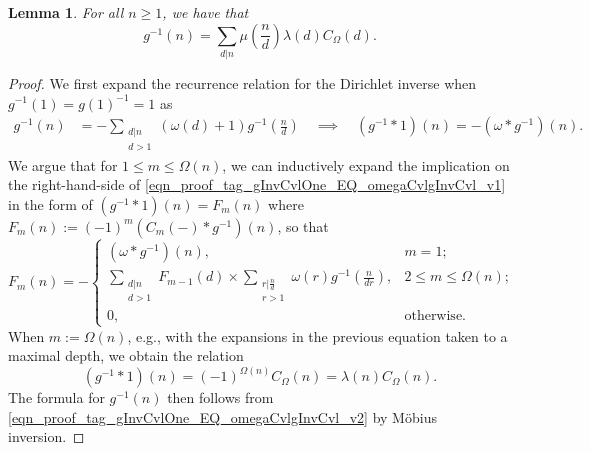 \documentclass[11pt,reqno,a4letter]{article}
\numberwithin{figure}{section}
\numberwithin{table}{section}
\theoremstyle{plain}
\newtheorem{lemma}[theorem]{Lemma}
\numberwithin{theorem}{section}
\theoremstyle{definition}
\begin{document}
\begin{lemma} 
\label{lemma_AnExactFormulaFor_gInvByMobiusInv_v1} 
For all $n \geq 1$, we have that 
\[
g^{-1}(n) = \sum_{d|n} \mu\left(\frac{n}{d}\right) \lambda(d) C_{\Omega}(d). 
\]
\end{lemma}
\begin{proof} 
We first expand the recurrence relation for the Dirichlet inverse 
when $g^{-1}(1) = g(1)^{-1} = 1$ as 
\begin{align} 
\label{eqn_proof_tag_gInvCvlOne_EQ_omegaCvlgInvCvl_v1} 
g^{-1}(n) & = - \sum_{\substack{d|n \\ d>1}} (\omega(d) + 1) g^{-1}\left(\frac{n}{d}\right) 
     \quad\implies\quad 
     (g^{-1} \ast 1)(n) = -(\omega \ast g^{-1})(n). 
\end{align} 
We argue that for $1 \leq m \leq \Omega(n)$, we can inductively expand the 
implication on the right-hand-side of \eqref{eqn_proof_tag_gInvCvlOne_EQ_omegaCvlgInvCvl_v1} 
in the form of $(g^{-1} \ast 1)(n) = F_m(n)$ where 
$F_m(n) := (-1)^{m} (C_m(-) \ast g^{-1})(n)$, so that 
\[
F_m(n) = - 
     \begin{cases} 
     (\omega \ast g^{-1})(n), & m = 1; \\ 
     \sum\limits_{\substack{d|n \\ d > 1}} F_{m-1}(d) \times \sum\limits_{\substack{r|\frac{n}{d} \\ r > 1}} 
     \omega(r) g^{-1}\left(\frac{n}{dr}\right), & 2 \leq m \leq \Omega(n); \\ 
     0, & \text{otherwise.} 
     \end{cases} 
\]
When $m := \Omega(n)$, e.g., with the expansions 
in the previous equation taken to a maximal depth, we obtain the relation 
\begin{equation} 
\label{eqn_proof_tag_gInvCvlOne_EQ_omegaCvlgInvCvl_v2} 
(g^{-1} \ast 1)(n) = (-1)^{\Omega(n)} C_{\Omega}(n) = \lambda(n) C_{\Omega}(n). 
\end{equation} 
The formula for $g^{-1}(n)$ then follows from 
\eqref{eqn_proof_tag_gInvCvlOne_EQ_omegaCvlgInvCvl_v2} 
by M\"obius inversion. 
\end{proof} 
\end{document}
